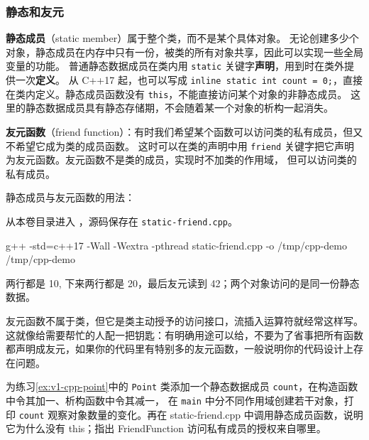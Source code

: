 \subsubsection{静态和友元}

\textbf{静态成员}（static member）属于整个类，而不是某个具体对象。
无论创建多少个对象，静态成员在内存中只有一份，被类的所有对象共享，因此可以实现一些全局变量的功能。
普通静态数据成员在类内用 \texttt{static} 关键字\textbf{声明}，用到时在类外提供一次\textbf{定义}。
从 C++17 起，也可以写成 \texttt{inline static int count = 0;}，直接在类内定义。静态成员函数没有 \texttt{this}，不能直接访问某个对象的非静态成员。
这里的静态数据成员具有静态存储期，不会随着某一个对象的析构一起消失。

\textbf{友元函数}（friend function）：有时我们希望某个函数可以访问类的私有成员，但又不希望它成为类的成员函数。
这时可以在类的声明中用 \texttt{friend} 关键字把它声明为友元函数。友元函数不是类的成员，实现时不加类的作用域，
但可以访问类的私有成员。

\begin{example}
静态成员与友元函数的用法：



从本卷目录进入 ，源码保存在 \texttt{static-friend.cpp}。
\begin{tbash}
g++ -std=c++17 -Wall -Wextra -pthread static-friend.cpp -o /tmp/cpp-demo
/tmp/cpp-demo
\end{tbash}
两行都是 10, 下来两行都是 20，最后友元读到 42；两个对象访问的是同一份静态数据。
\end{example}

\begin{note}
友元函数不属于类，但它是类主动授予的访问接口，流插入运算符就经常这样写。
这就像给需要帮忙的人配一把钥匙：有明确用途可以给，不要为了省事把所有函数都声明成友元，如果你的代码里有特别多的友元函数，一般说明你的代码设计上存在问题。
\end{note}

\begin{exercise}\label{ex:v1-cpp-count}

为练习\ref{ex:v1-cpp-point}中的 \texttt{Point} 类添加一个静态数据成员 \texttt{count}，在构造函数中令其加一、析构函数中令其减一，
在 \texttt{main} 中分不同作用域创建若干对象，打印 \texttt{count} 观察对象数量的变化。再在 static-friend.cpp 中调用静态成员函数，说明它为什么没有 this；指出 FriendFunction 访问私有成员的授权来自哪里。
\end{exercise}

